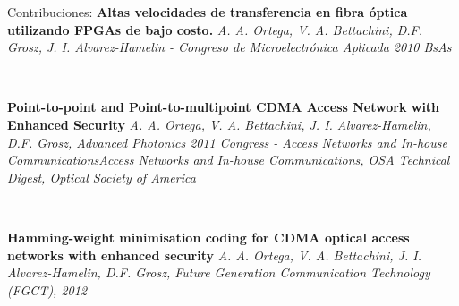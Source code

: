 \documentclass[aspectratio=169]{beamer}
\begin{document}


\begin{frame}{Contribuciones:}
\textbf{Altas velocidades de transferencia en fibra óptica utilizando FPGAs de bajo costo. } \textit{A. A. Ortega, V. A. Bettachini, D.F. Grosz, J. I. Alvarez-Hamelin - Congreso de Microelectrónica Aplicada 2010 BsAs}

\

\textbf{ Point-to-point and Point-to-multipoint CDMA Access Network with Enhanced Security} \textit{ A. A. Ortega, V. A. Bettachini, J. I. Alvarez-Hamelin,  D.F. Grosz, Advanced Photonics 2011 Congress - Access Networks and In-house CommunicationsAccess Networks and In-house Communications, OSA Technical Digest, Optical Society of America}

\

\textbf{Hamming-weight minimisation coding for CDMA optical access networks with enhanced security} \textit{ A. A. Ortega, V. A. Bettachini, J. I. Alvarez-Hamelin, D.F. Grosz, Future Generation Communication Technology (FGCT), 2012}


\end{frame}
\end{document}
